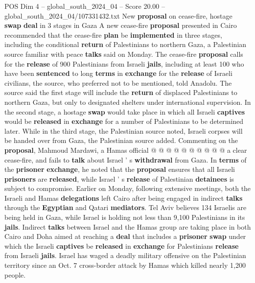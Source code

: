 \begin{textsample}{POS Dim 4 – global\_south\_2024\_04 – Score 20.00 – global\_south\_2024\_04/107331432.txt}  \label{ex:f4_pos_266}
New \textbf{proposal} on cease-fire, hostage \textbf{swap} \textbf{deal} in 3 stages in Gaza A new cease-fire \textbf{proposal} presented in Cairo recommended that the cease-fire \textbf{plan} be \textbf{implemented} in three stages, including the conditional \textbf{return} of Palestinians to northern Gaza, a Palestinian source familiar with peace \textbf{talks} said on Monday.
The cease-fire \textbf{proposal} calls for the \textbf{release} of 900 Palestinians from Israeli \textbf{jails}, including at least 100 who have been \textbf{sentenced} to long \textbf{terms} in \textbf{exchange} for the \textbf{release} of Israeli civilians, the source, who preferred not to be mentioned, told Anadolu.
The source said the first stage will include the \textbf{return} of displaced Palestinians to northern Gaza, but only to designated shelters under international supervision.
In the second stage, a hostage \textbf{swap} would take place in which all Israeli \textbf{captives} would be \textbf{released} in \textbf{exchange} for a number of Palestinians to be determined later.
While in the third stage, the Palestinian source noted, Israeli corpses will be handed over from Gaza, the Palestinian source added.
Commenting on the \textbf{proposal}, Mahmoud Mardawi, a Hamas official @ @ @ @ @ @ @ @ @ @ a clear cease-fire, and fails to \textbf{talk} about Israel ' s \textbf{withdrawal} from Gaza.
In \textbf{terms} of the \textbf{prisoner} \textbf{exchange}, he noted that the \textbf{proposal} ensures that all Israeli \textbf{prisoners} are \textbf{released}, while Israel ' s \textbf{release} of Palestinian \textbf{detainees} is subject to compromise.
Earlier on Monday, following extensive meetings, both the Israeli and Hamas \textbf{delegations} left Cairo after being engaged in indirect \textbf{talks} through the \textbf{Egyptian} and Qatari \textbf{mediators}.
Tel Aviv believes 134 Israelis are being held in Gaza, while Israel is holding not less than 9,100 Palestinians in its \textbf{jails}.
Indirect \textbf{talks} between Israel and the Hamas group are taking place in both Cairo and Doha aimed at reaching a \textbf{deal} that includes a \textbf{prisoner} \textbf{swap} under which the Israeli \textbf{captives} be \textbf{released} in \textbf{exchange} for Palestinians \textbf{release} from Israeli \textbf{jails}.
Israel has waged a deadly military offensive on the Palestinian territory since an Oct. 7 cross-border attack by Hamas which killed nearly 1,200 people.

\end{textsample}
